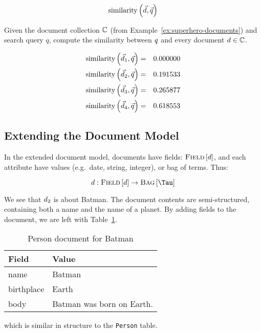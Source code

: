 		$$\operatorname{similarity}\left(\vec{d}, \vec{q}\right)$$
		
		\begin{ex}
			Given the document collection $\mathbb{C}$ (from Example~\ref{ex:superhero-documents}) and search query $q$, compute the similarity between $q$ and every document $d \in \mathbb{C}$.
			
			\begin{eqnarray}
				\operatorname{similarity}\left(\vec{d}_1, \vec{q}\right) &=& 0.000000 \\
				\operatorname{similarity}\left(\vec{d}_2, \vec{q}\right) &=& 0.191533 \\
				\operatorname{similarity}\left(\vec{d}_3, \vec{q}\right) &=& 0.265877 \\
				\operatorname{similarity}\left(\vec{d}_4, \vec{q}\right) &=& 0.618553
			\end{eqnarray}
		\end{ex}
		
	\subsection{Extending the Document Model}
	\label{sec:extending-the-document-model}
		In the extended document model, documents have fields: $\textsc{Field}\left[d\right]$, and each attribute have values (e.g.~date, string, integer), or bag of terms.  Thus:

		$$\doc :\fields{\doc} \to \bag{\terms}$$
		
		\begin{ex}
			We see that $d_2$ is about Batman.  The document contents are semi-structured, containing both a name and the name of a planet.  By adding fields to the document, we are left with Table~\ref{tbl:person-document}.
			
			\begin{table}[!ht]
				\centering
				
				\begin{tabular}{ll}
					\toprule
					Field & Value \\
					\midrule
					name & Batman \\
					birthplace & Earth \\
					body & Batman was born on Earth. \\
					\bottomrule
				\end{tabular}
				
				\caption{Person document for Batman}
				\label{tbl:person-document}
			\end{table}
			
			which is similar in structure to the \texttt{Person} table.
		\end{ex}
		
